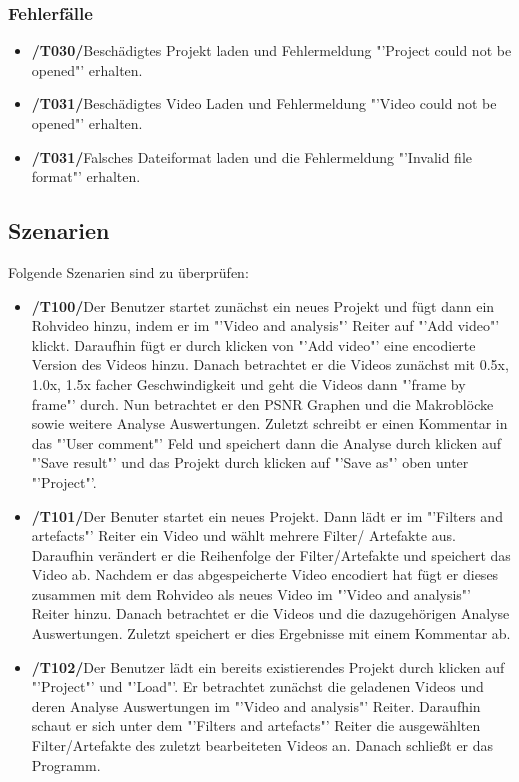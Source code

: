 \documentclass[parskip=full]{scrartcl}
\begin{document}
\subsubsection{Fehlerfälle}
\begin{itemize}
\item[]\textbf{/T030/}\qquad Beschädigtes Projekt laden und Fehlermeldung "'Project could not be opened"' erhalten.
\item[]\textbf{/T031/}\qquad Beschädigtes Video Laden und Fehlermeldung "'Video could not be opened"' erhalten.
\item[]\textbf{/T031/}\qquad Falsches Dateiformat laden und die Fehlermeldung "'Invalid file format"' erhalten.
\end{itemize}
\subsection{Szenarien}
Folgende Szenarien sind zu überprüfen:
\begin{itemize}
\item[]\textbf{/T100/}\qquad Der Benutzer startet zunächst ein neues Projekt und fügt dann ein Rohvideo hinzu, indem er im "'Video and analysis"' Reiter auf "'Add video"' klickt. Daraufhin fügt er durch klicken von "'Add video"' eine encodierte Version des Videos hinzu. Danach betrachtet er die Videos zunächst mit 0.5x, 1.0x, 1.5x facher Geschwindigkeit und geht die Videos dann "'frame by frame"' durch. Nun betrachtet er den PSNR Graphen und die Makroblöcke sowie weitere Analyse Auswertungen. Zuletzt schreibt er einen Kommentar in das "'User comment"' Feld und speichert dann die Analyse durch klicken auf "'Save result"' und das Projekt durch klicken auf "'Save as"' oben unter "'Project"'.
\item[]\textbf{/T101/}\qquad Der Benuter startet ein neues Projekt. Dann lädt er im "'Filters and artefacts"' Reiter ein Video und wählt mehrere Filter/ Artefakte aus. Daraufhin verändert er die Reihenfolge der Filter/Artefakte und speichert das Video ab. Nachdem er das abgespeicherte Video encodiert hat fügt er dieses zusammen mit dem Rohvideo als neues Video im "'Video and analysis"' Reiter hinzu. Danach betrachtet er die Videos und die dazugehörigen Analyse Auswertungen. Zuletzt speichert er dies Ergebnisse mit einem Kommentar ab.
\item[]\textbf{/T102/}\qquad Der Benutzer lädt ein bereits existierendes Projekt durch klicken auf "'Project"' und "'Load"'. Er betrachtet zunächst die geladenen Videos und deren Analyse Auswertungen im "'Video and analysis"' Reiter. Daraufhin schaut er sich unter dem "'Filters and artefacts"' Reiter die ausgewählten Filter/Artefakte des zuletzt bearbeiteten Videos an. Danach schließt er das Programm.
\end{itemize}
\newpage
\end{document}
